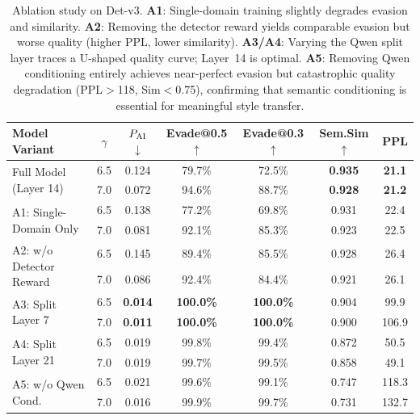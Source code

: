 \begin{table}[t]
\centering
\small
\begin{tabular}{l c cccc c}
\toprule
\textbf{Model Variant} & $\gamma$ & $P_{\text{AI}}$$\downarrow$ & \textbf{Evade@0.5}$\uparrow$ & \textbf{Evade@0.3}$\uparrow$ & \textbf{Sem.Sim}$\uparrow$ & \textbf{PPL} \\
\midrule
\multirow{2}{*}{Full Model (Layer 14)} 
& 6.5 & 0.124 & 79.7\% & 72.5\% & \textbf{0.935} & \textbf{21.1} \\
& 7.0 & 0.072 & 94.6\% & 88.7\% & \textbf{0.928} & \textbf{21.2} \\
\midrule
\multirow{2}{*}{A1: Single-Domain Only}
& 6.5 & 0.138 & 77.2\% & 69.8\% & 0.931 & 22.4 \\
& 7.0 & 0.081 & 92.1\% & 85.3\% & 0.923 & 22.5 \\
\midrule
\multirow{2}{*}{A2: w/o Detector Reward}
& 6.5 & 0.145 & 89.4\% & 85.5\% & 0.928 & 26.4 \\
& 7.0 & 0.086 & 92.4\% & 84.4\% & 0.921 & 26.1 \\
\midrule
\multirow{2}{*}{A3: Split Layer 7}
& 6.5 & \textbf{0.014} & \textbf{100.0\%} & \textbf{100.0\%} & 0.904 & 99.9 \\
& 7.0 & \textbf{0.011} & \textbf{100.0\%} & \textbf{100.0\%} & 0.900 & 106.9 \\
\midrule
\multirow{2}{*}{A4: Split Layer 21}
& 6.5 & 0.019 & 99.8\% & 99.4\% & 0.872 & 50.5 \\
& 7.0 & 0.019 & 99.7\% & 99.5\% & 0.858 & 49.1 \\
\midrule
\multirow{2}{*}{A5: w/o Qwen Cond.}
& 6.5 & 0.021 & 99.6\% & 99.1\% & 0.747 & 118.3 \\
& 7.0 & 0.016 & 99.9\% & 99.7\% & 0.731 & 132.7 \\
\bottomrule
\end{tabular}
\caption{Ablation study on Det-v3. \textbf{A1}: Single-domain training slightly degrades evasion and similarity. \textbf{A2}: Removing the detector reward yields comparable evasion but worse quality (higher PPL, lower similarity). \textbf{A3/A4}: Varying the Qwen split layer traces a U-shaped quality curve; Layer~14 is optimal. \textbf{A5}: Removing Qwen conditioning entirely achieves near-perfect evasion but catastrophic quality degradation (PPL$>$118, Sim$<$0.75), confirming that semantic conditioning is essential for meaningful style transfer.}
\label{tab:ablation}
\end{table}
